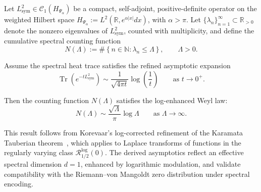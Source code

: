 \begin{lemma}
\label{lem:korevaar_tauberian_application}
Let \( L_{\mathrm{sym}}^2 \in \mathcal{C}_1(H_{\Psi_\alpha}) \) be a compact, self-adjoint, positive-definite operator on the weighted Hilbert space \( H_{\Psi_\alpha} := L^2(\mathbb{R}, e^{\alpha|x|} dx) \), with \( \alpha > \pi \). Let \( \{ \lambda_n \}_{n=1}^\infty \subset \mathbb{R}_{>0} \) denote the nonzero eigenvalues of \( L_{\mathrm{sym}}^2 \), counted with multiplicity, and define the cumulative spectral counting function
\[
N(\Lambda) := \#\left\{ n \in \mathbb{N} : \lambda_n \le \Lambda \right\}, \qquad \Lambda > 0.
\]

Assume the spectral heat trace satisfies the refined asymptotic expansion
\[
\operatorname{Tr}(e^{-t L_{\mathrm{sym}}^2}) \sim \frac{1}{\sqrt{4\pi t}} \log\left( \frac{1}{t} \right) \qquad \text{as } t \to 0^+.
\]

Then the counting function \( N(\Lambda) \) satisfies the log-enhanced Weyl law:
\[
N(\Lambda) \sim \frac{\sqrt{\Lambda}}{\pi} \log \Lambda \qquad \text{as } \Lambda \to \infty.
\]

\medskip
\noindent
This result follows from Korevaar’s log-corrected refinement of the Karamata Tauberian theorem~\cite[Ch.~III, §5]{Korevaar2004Tauberian}, which applies to Laplace transforms of functions in the regularly varying class \( \mathcal{R}_{1/2}^{\log}(0) \). The derived asymptotics reflect an effective spectral dimension \( d = 1 \), enhanced by logarithmic modulation, and validate compatibility with the Riemann–von Mangoldt zero distribution under spectral encoding.
\end{lemma}

